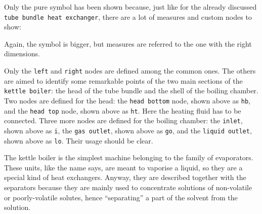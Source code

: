 \documentclass[12pt]{article}						%
\newcommand*{\chpn}[1]{\texttt{#1}}				%
\newcommand*{\chpp}[1]{\texttt{#1}}				%
\begin{document}
Only the pure symbol has been shown because, just like for the already
discussed \chpp{tube bundle heat exchanger}, there are a lot of measures and
custom nodes to show:
\begin{center}
\end{center}
Again, the symbol is bigger, but measures are referred to the one with the
right dimensions.

Only the \chpn{left} and \chpn{right} nodes are defined among the common ones.
The others are aimed to identify some remarkable points of the two main sections
of the \chpp{kettle boiler}: the head of the tube bundle and the shell of the
boiling chamber. Two nodes are defined for the head: the \chpn{head bottom}
node, shown above as \chpn{hb}, and the \chpn{head top} node, shown above as
\chpn{ht}. Here the heating fluid has to be connected. Three more nodes are
defined for the boiling chamber: the \chpn{inlet}, shown above as \chpn{i}, the
\chpn{gas outlet}, shown above as \chpn{go}, and the \chpn{liquid outlet}, shown
above as \chpn{lo}. Their usage should be clear.

The kettle boiler is the simplest machine belonging to the family of
evaporators. These units, like the name says, are meant to vaporise a liquid, so
they are a special kind of heat exchangers. Anyway, they are described together
with the separators because they are mainly used to concentrate solutions of
non-volatile or poorly-volatile solutes, hence ``separating'' a part of the
solvent from the solution.
\end{document}

